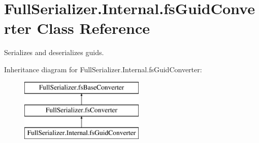 \hypertarget{class_full_serializer_1_1_internal_1_1fs_guid_converter}{}\section{Full\+Serializer.\+Internal.\+fs\+Guid\+Converter Class Reference}
\label{class_full_serializer_1_1_internal_1_1fs_guid_converter}


Serializes and deserializes guids.  


Inheritance diagram for Full\+Serializer.\+Internal.\+fs\+Guid\+Converter\+:\begin{figure}[H]
\begin{center}
\leavevmode
\includegraphics[height=3.000000cm]{class_full_serializer_1_1_internal_1_1fs_guid_converter}
\end{center}
\end{figure}
